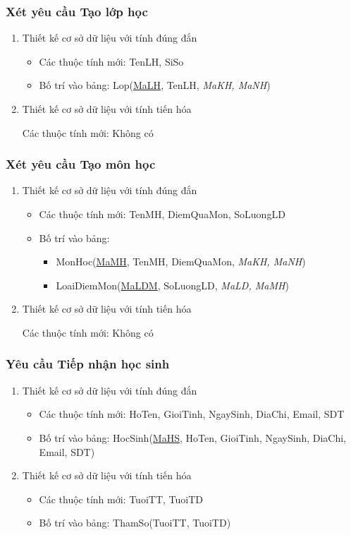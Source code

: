 \documentclass[a4paper]{article}
\begin{document}
\subsubsection{Xét yêu cầu Tạo lớp học}
\begin{enumerate}
\item Thiết kế cơ sở dữ liệu với tính đúng đắn
\begin{itemize}
\item Các thuộc tính mới: TenLH, SiSo
\item Bố trí vào bảng: Lop(\underline{MaLH}, TenLH, \textit{MaKH, MaNH})
\end{itemize}
\item Thiết kế cơ sở dữ liệu với tính tiến hóa

Các thuộc tính mới: Không có

\end{enumerate}

\subsubsection{Xét yêu cầu Tạo môn học}
\begin{enumerate}
\item Thiết kế cơ sở dữ liệu với tính đúng đắn
\begin{itemize}
\item Các thuộc tính mới: TenMH, DiemQuaMon, SoLuongLD
\item Bố trí vào bảng:
\begin{itemize}
\item MonHoc(\underline{MaMH}, TenMH, DiemQuaMon, \textit{MaKH, MaNH})
\item LoaiDiemMon(\underline{MaLDM}, SoLuongLD, \textit{MaLD, MaMH})
\end{itemize} 
\end{itemize}
\item Thiết kế cơ sở dữ liệu với tính tiến hóa

Các thuộc tính mới: Không có

\end{enumerate}
	\subsubsection{Yêu cầu Tiếp nhận học sinh}
\begin{enumerate}
\item Thiết kế cơ sở dữ liệu với tính đúng đắn
\begin{itemize}
\item Các thuộc tính mới: HoTen, GioiTinh, NgaySinh, DiaChi, Email, SDT
\item Bố trí vào bảng: HocSinh(\underline{MaHS}, HoTen, GioiTinh, NgaySinh, DiaChi, Email, SDT)
\end{itemize}
\item Thiết kế cơ sở dữ liệu với tính tiến hóa
\begin{itemize}
\item Các thuộc tính mới: TuoiTT, TuoiTD
\item Bố trí vào bảng: ThamSo(TuoiTT, TuoiTD)
\end{itemize}
\end{enumerate}
	
\end{document}
